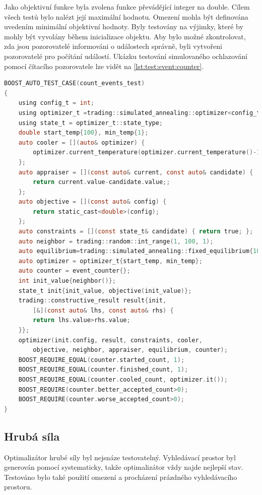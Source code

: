 Jako objektivní funkce byla zvolena funkce převádějící integer na double.
Cílem všech testů bylo nalézt její maximální hodnotu.
Omezení mohla být definována uvedením minimální objektivní hodnoty.
Byly testovány na výjimky, které by mohly být vyvolány během inicializace objektu.
Aby bylo možné zkontrolovat, zda jsou pozorovatelé informováni o událostech správně, byli vytvořeni pozorovatelé pro počítání událostí.
Ukázku testování simulovaného ochlazování pomocí čítacího pozorovatele lze vidět na \ref{lst:test:event:counter}.

\begin{lstlisting}[caption={~Testování optimalizátoru pomocí pozorovatele},label={lst:test:event:counter},captionpos=t,abovecaptionskip=-\medskipamount,belowcaptionskip=\medskipamount,language=C]
BOOST_AUTO_TEST_CASE(count_events_test)
{
    using config_t = int;
    using optimizer_t =trading::simulated_annealing::optimizer<config_t>;
    using state_t = optimizer_t::state_type;
    double start_temp{100}, min_temp{1};
    auto cooler = [](auto& optimizer) {
        optimizer.current_temperature(optimizer.current_temperature()-1);
    };
    auto appraiser = [](const auto& current, const auto& candidate) {
        return current.value-candidate.value;;
    };
    auto objective = [](const auto& config) {
        return static_cast<double>(config);
    };
    auto constraints = [](const state_t& candidate) { return true; };
    auto neighbor = trading::random::int_range(1, 100, 1);
    auto equilibrium=trading::simulated_annealing::fixed_equilibrium{10};
    auto optimizer = optimizer_t{start_temp, min_temp};
    auto counter = event_counter{};
    int init_value{neighbor()};
    state_t init{init_value, objective(init_value)};
    trading::constructive_result result{init,
        [&](const auto& lhs, const auto& rhs) {
        return lhs.value>rhs.value;
    }};
    optimizer(init.config, result, constraints, cooler,
        objective, neighbor, appraiser, equilibrium, counter);
    BOOST_REQUIRE_EQUAL(counter.started_count, 1);
    BOOST_REQUIRE_EQUAL(counter.finished_count, 1);
    BOOST_REQUIRE_EQUAL(counter.cooled_count, optimizer.it());
    BOOST_REQUIRE(counter.better_accepted_count>0);
    BOOST_REQUIRE(counter.worse_accepted_count>0);
}
\end{lstlisting}

\subsection{Hrubá síla}
Optimalizátor hrubé síly byl nejsnáze testovatelný.
Vyhledávací prostor byl generován pomocí systematicky, takže optimalizátor vždy najde nejlepší stav.
Testováno bylo také použití omezení a procházení prázdného vyhledávacího prostoru.

